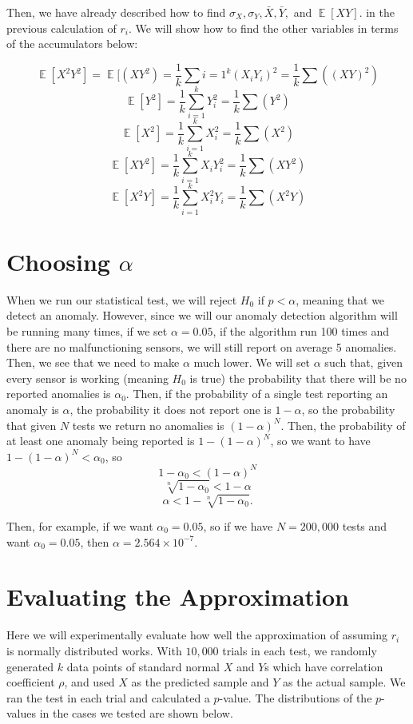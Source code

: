 \documentclass{article}
\DeclareMathOperator{\E}{\mathbb{E}}
\begin{document}
Then, we have already described how to find $\sigma_X, \sigma_Y, \bar X, \bar Y,$ and $\E[XY]$. in the previous calculation of $r_i$. We will show how to find the other variables in terms of the accumulators below:

$$\E[X^2Y^2] = \E[(XY^2) = \frac{1}{k} \sum{i=1}^k (X_iY_i)^2 = \frac{1}{k}\sum((XY)^2)$$
$$\E[Y^2] = \frac{1}{k} \sum_{i = 1}^k Y_i^2 = \frac{1}{k} \sum(Y^2)$$
$$\E[X^2] = \frac{1}{k} \sum_{i = 1}^k X_i^2 = \frac{1}{k} \sum(X^2)$$
$$\E[XY^2] = \frac{1}{k} \sum_{i = 1}^k X_iY_i^2 = \frac{1}{k} \sum(XY^2)$$
$$\E[X^2Y] = \frac{1}{k} \sum_{i = 1}^k X_i^2Y_i = \frac{1}{k} \sum(X^2Y)$$

\section{Choosing $\alpha$}

When we run our statistical test, we will reject $H_0$ if $p < \alpha$, meaning that we detect an anomaly. However, since we will our anomaly detection algorithm will be running many times, if we set $\alpha = 0.05$, if the algorithm run 100 times and there are no malfunctioning sensors, we will still report on average 5 anomalies. Then, we see that we need to make $\alpha$ much lower. We will set $\alpha$ such that, given every sensor is working (meaning $H_0$ is true) the probability that there will be no reported anomalies is $\alpha_0$. Then, if the probability of a single test reporting an anomaly is $\alpha$, the probability it does not report one is $1 - \alpha$, so the probability that given $N$ tests we return no anomalies is $(1 - \alpha)^N$. Then, the probability of at least one anomaly being reported is $1 - (1- \alpha)^N$, so we want to have $1 - (1 - \alpha)^N < \alpha_0$, so
$$1 - \alpha_0 < (1 - \alpha)^N$$
$$\sqrt[n]{1 - \alpha_0} < 1 - \alpha$$
$$\alpha < 1 - \sqrt[n]{1 - \alpha_0}.$$

Then, for example, if we want $\alpha_0 = 0.05$, so if we have $N = 200,000$ tests and want $\alpha_0 = 0.05$, then $\alpha = 2.564 \times 10^{-7}$.

\section{Evaluating the Approximation}

Here we will experimentally evaluate how well the approximation of assuming $r_i$ is normally distributed works. With $10,000$ trials in each test, we randomly generated $k$ data points of standard normal $X$ and $Y$s which have correlation coefficient $\rho$, and used $X$ as the predicted sample and $Y$ as the actual sample. We ran the test in each trial and calculated a $p$-value. The distributions of the $p$-values in the cases we tested are shown below.
\end{document}
